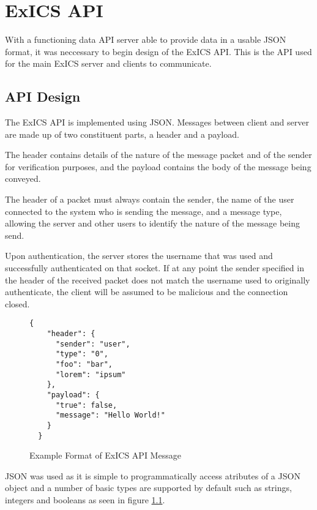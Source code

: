 \chapter{ExICS API}
\label{ch:exicsapi}

With a functioning data API server able to provide data in a usable JSON format, it was neccessary to begin design of the ExICS API.  This is the API used for the main ExICS server and clients to communicate.

\section{API Design}
\label{sec:api_design}

\FloatBarrier

The ExICS API is implemented using JSON.  Messages between client and server are made up of two constituent parts, a header and a payload.

The header contains details of the nature of the message packet and of the sender for verification purposes, and the payload contains the body of the message being conveyed.

The header of a packet must always contain the sender, the name of the user connected to the system who is sending the message, and a message type, allowing the server and other users to identify the nature of the message being send.

Upon authentication, the server stores the username that was used and successfully authenticated on that socket.  If at any point the sender specified in the header of the received packet does not match the username used to originally authenticate, the client will be assumed to be malicious and the connection closed.

\begin{figure}[h]
  \centering
  \lstset{language=JSON}
  \begin{lstlisting}[tabsize=2,breaklines=true]
  {
    "header": {
      "sender": "user",
      "type": "0",
      "foo": "bar",
      "lorem": "ipsum"
    },
    "payload": {
      "true": false,
      "message": "Hello World!"
    }
  }
  \end{lstlisting}
  \caption{Example Format of ExICS API Message}
  \label{fig:exics_api_example}
\end{figure}

JSON was used as it is simple to programmatically access atributes of a JSON object and a number of basic types are supported by default such as strings, integers and booleans as seen in figure \ref{fig:exics_api_example}.

